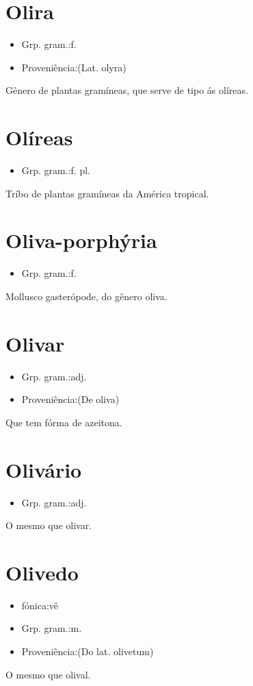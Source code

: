\section{Olira}
\begin{itemize}
\item {Grp. gram.:f.}
\end{itemize}
\begin{itemize}
\item {Proveniência:(Lat. \textunderscore olyra\textunderscore )}
\end{itemize}
Gênero de plantas gramíneas, que serve de tipo ás olíreas.
\section{Olíreas}
\begin{itemize}
\item {Grp. gram.:f. pl.}
\end{itemize}
Tríbo de plantas gramíneas da América tropical.
\section{Oliva-porphýria}
\begin{itemize}
\item {Grp. gram.:f.}
\end{itemize}
Mollusco gasterópode, do gênero oliva.
\section{Olivar}
\begin{itemize}
\item {Grp. gram.:adj.}
\end{itemize}
\begin{itemize}
\item {Proveniência:(De \textunderscore oliva\textunderscore )}
\end{itemize}
Que tem fórma de azeitona.
\section{Olivário}
\begin{itemize}
\item {Grp. gram.:adj.}
\end{itemize}
O mesmo que \textunderscore olivar\textunderscore .
\section{Olivedo}
\begin{itemize}
\item {fónica:vê}
\end{itemize}
\begin{itemize}
\item {Grp. gram.:m.}
\end{itemize}
\begin{itemize}
\item {Proveniência:(Do lat. \textunderscore olivetum\textunderscore )}
\end{itemize}
O mesmo que \textunderscore olival\textunderscore .
